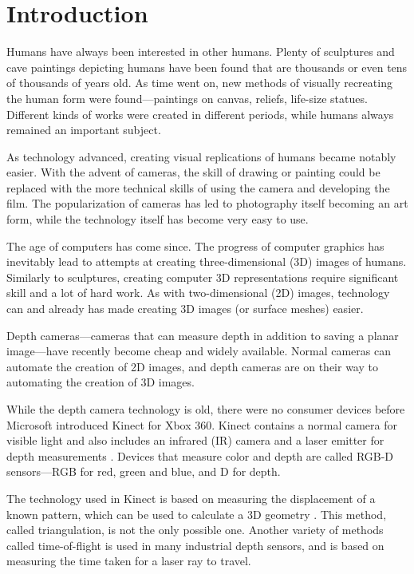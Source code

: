 \chapter{Introduction}

Humans have always been interested in other humans. Plenty of sculptures and cave paintings depicting humans have been found that are thousands or even tens of thousands of years old. As time went on, new methods of visually recreating the human form were found---paintings on canvas, reliefs, life-size statues. Different kinds of works were created in different periods, while humans always remained an important subject.

As technology advanced, creating visual replications of humans became notably easier. With the advent of cameras, the skill of drawing or painting could be replaced with the more technical skills of using the camera and developing the film. The popularization of cameras has led to photography itself becoming an art form, while the technology itself has become very easy to use.

The age of computers has come since. The progress of computer graphics has inevitably lead to attempts at creating three-dimensional (3D) images of humans. Similarly to sculptures, creating computer 3D representations require significant skill and a lot of hard work. As with two-dimensional (2D) images, technology can and already has made creating 3D images (or surface meshes) easier.

Depth cameras---cameras that can measure depth in addition to saving a planar image---have recently become cheap and widely available. Normal cameras can automate the creation of 2D images, and depth cameras are on their way to automating the creation of 3D images.

While the depth camera technology is old, there were no consumer devices before Microsoft introduced Kinect for Xbox 360. Kinect contains a normal camera for visible light and also includes an infrared (IR) camera and a laser emitter for depth measurements \citep{fisher2010}. Devices that measure color and depth are called RGB-D sensors---RGB for red, green and blue, and D for depth.

The technology used in Kinect is based on measuring the displacement of a known pattern, which can be used to calculate a 3D geometry \citep{reichinger2011}. This method, called triangulation, is not the only possible one. Another variety of methods called time-of-flight is used in many industrial depth sensors, and is based on measuring the time taken for a laser ray to travel.

